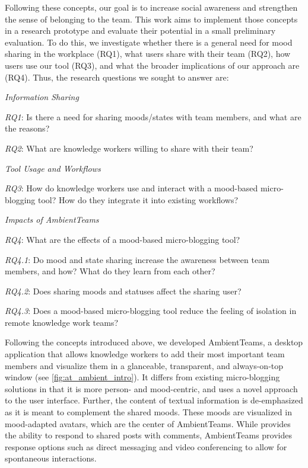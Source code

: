 Following these concepts, our goal is to increase social awareness and strengthen the sense of belonging to the team. This work aims to implement those concepts in a research prototype and evaluate their potential in a small preliminary evaluation. To do this, we investigate whether there is a general need for mood sharing in the workplace (RQ1), what users share with their team (RQ2), how users use our tool (RQ3), and what the broader implications of our approach are (RQ4). Thus, the research questions we sought to answer are:

\bigskip\noindent\textit{Information Sharing}

\smallskip\noindent\textit{RQ1}: Is there a need for sharing moods/states with team members, and what are the reasons?

\smallskip\noindent\textit{RQ2}: What are knowledge workers willing to share with their team?

\medskip\noindent\textit{Tool Usage and Workflows}

\smallskip\noindent\textit{RQ3}: How do knowledge workers use and interact with a mood-based micro-blogging tool? How do they integrate it into existing workflows?

\medskip\noindent\textit{Impacts of AmbientTeams}

\smallskip\noindent\textit{RQ4}: What are the effects of a mood-based micro-blogging tool?

\setlength{\leftskip}{0.5cm}
\smallskip\noindent\textit{RQ4.1}: Do mood and state sharing increase the awareness between team members, and how? What do they learn from each other?

\smallskip\noindent\textit{RQ4.2}: Does sharing moods and statuses affect the sharing user?

\smallskip\noindent\textit{RQ4.3}: Does a mood-based micro-blogging tool reduce the feeling of isolation in remote knowledge work teams?


\setlength{\leftskip}{0pt}

\bigskip\noindent Following the concepts introduced above, we developed AmbientTeams, a desktop application that allows knowledge workers to add their most important team members and visualize them in a glanceable, transparent, and always-on-top window (see \autoref{fig:at_ambient_intro}). It differs from existing micro-blogging solutions in that it is more person- and mood-centric, and uses a novel approach to the user interface. Further, the content of textual information is de-emphasized as it is meant to complement the shared moods. These moods are visualized in mood-adapted avatars, which are the center of AmbientTeams. While \textcite{dullemond2013fixing} provides the ability to respond to shared posts with comments, AmbientTeams provides response options such as direct messaging and video conferencing to allow for spontaneous interactions. 

